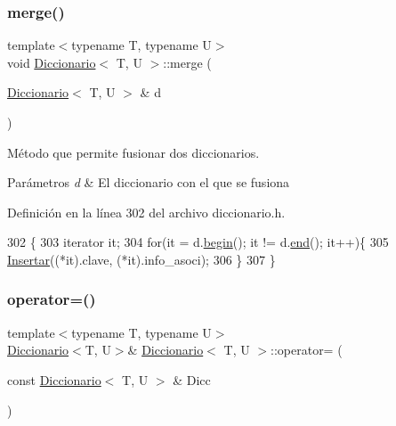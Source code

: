\subsubsection{\texorpdfstring{merge()}{merge()}}
{\footnotesize\ttfamily template$<$typename T, typename U$>$ \\
void \hyperlink{classDiccionario}{Diccionario}$<$ T, U $>$\+::merge (\begin{DoxyParamCaption}\item[{\hyperlink{classDiccionario}{Diccionario}$<$ T, U $>$ \&}]{d }\end{DoxyParamCaption})\hspace{0.3cm}{\ttfamily [inline]}}



Método que permite fusionar dos diccionarios. 


\begin{DoxyParams}{Parámetros}
{\em d} & El diccionario con el que se fusiona \\
\hline
\end{DoxyParams}


Definición en la línea 302 del archivo diccionario.\+h.


\begin{DoxyCode}
302                                     \{
303         iterator it;
304         \textcolor{keywordflow}{for}(it = d.\hyperlink{classDiccionario_aa17ce3d7317d78f5927ae7c0564089cc}{begin}(); it != d.\hyperlink{classDiccionario_adb5cdbfce59b4005bd07473273df3a8e}{end}(); it++)\{
305             \hyperlink{classDiccionario_af520b73907852cc8002260ddf9fb822c}{Insertar}((*it).clave, (*it).info\_asoci);
306         \}
307     \}
\end{DoxyCode}
\mbox{\label{classDiccionario_a9e3a25d2a40117d3a99ac97e37b70f04}} 
\subsubsection{\texorpdfstring{operator=()}{operator=()}}
{\footnotesize\ttfamily template$<$typename T, typename U$>$ \\
\hyperlink{classDiccionario}{Diccionario}$<$T, U$>$\& \hyperlink{classDiccionario}{Diccionario}$<$ T, U $>$\+::operator= (\begin{DoxyParamCaption}\item[{const \hyperlink{classDiccionario}{Diccionario}$<$ T, U $>$ \&}]{Dicc }\end{DoxyParamCaption})\hspace{0.3cm}{\ttfamily [inline]}}



